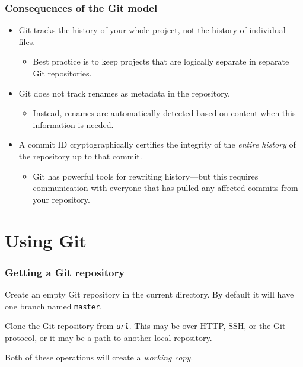 \documentclass{beamer}
\begin{document}
\begin{frame}
  \frametitle{Consequences of the Git model}

  \begin{itemize}
  \item Git tracks the history of your whole project, not the history
    of individual files.
    \begin{itemize}
    \item Best practice is to keep projects that are logically
      separate in separate Git repositories.
    \end{itemize}
  \item Git does not track renames as metadata in the repository.
    \begin{itemize}
    \item Instead, renames are automatically detected based on content
      when this information is needed.
    \end{itemize}
  \item A commit ID cryptographically certifies the integrity of the
    \emph{entire history} of the repository up to that commit.
    \begin{itemize}
    \item Git has powerful tools for rewriting history---but this
      requires communication with everyone that has pulled any
      affected commits from your repository.
    \end{itemize}
  \end{itemize}
\end{frame}

\section{Using Git}

\begin{frame}
  \frametitle{Getting a Git repository}

  \begin{description}
  \item[\texttt{git init}\hfill] Create an empty Git repository in the
    current directory.  By default it will have one branch named
    \texttt{master}.
  \item[\texttt{git clone \textit{url}}\hfill] Clone the Git
    repository from \texttt{\textit{url}}.  This may be over HTTP,
    SSH, or the Git protocol, or it may be a path to another local
    repository.
  \end{description}

  Both of these operations will create a \emph{working copy}.
\end{frame}
\end{document}
